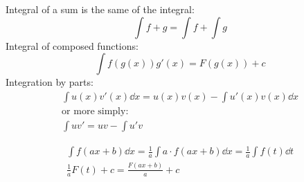 \documentclass[00_complete]{subfiles}
\begin{document}
Integral of a sum is the same of the integral:
\begin{equation}
    \int f + g = \int f + \int g
\end{equation}
Integral of composed functions:
\begin{equation}
    \int f(g(x))g'(x) = F(g(x)) + c
\end{equation}
Integration by parts:
\begin{equation}
\begin{gathered}
    \int u(x)v'(x)\dd{x} = u(x)v(x) - \int u'(x)v(x)\dd{x} \\
    \text{or more simply:} \\
    \int uv' = uv - \int u'v
\end{gathered}
\end{equation}
\begin{example}
    $$
    \begin{gathered}
        \int f(ax+b)\dd{x} = \frac{1}{a} \int a\cdot f(ax+b)\dd{x} =
        \frac{1}{a} \int f(t)\dd{t}
        \\
        \frac{1}{a}F(t)+c = \frac{F(ax+b)}{a}+c
    \end{gathered}
    $$
\end{example}
\end{document}

